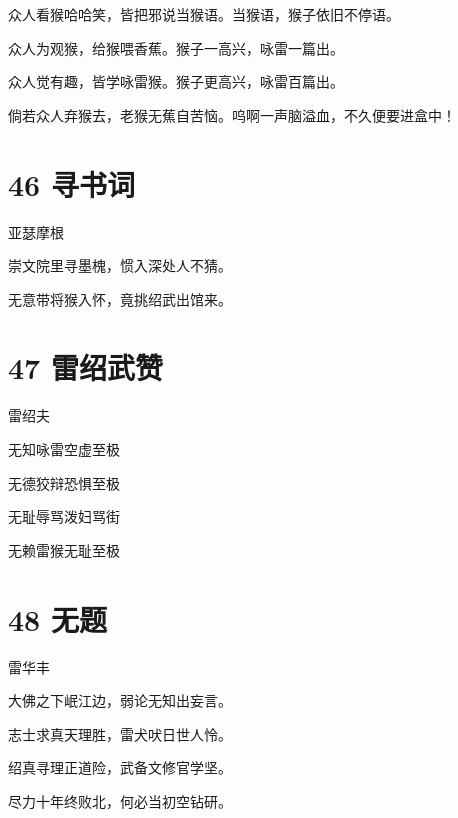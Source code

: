 \documentclass[UTF8,12pt,oneside]{ctexbook}
\begin{document}
        众人看猴哈哈笑，皆把邪说当猴语。当猴语，猴子依旧不停语。
        
        众人为观猴，给猴喂香蕉。猴子一高兴，咏雷一篇出。
        
        众人觉有趣，皆学咏雷猴。猴子更高兴，咏雷百篇出。
        
        倘若众人弃猴去，老猴无蕉自苦恼。呜啊一声脑溢血，不久便要进盒中！
        
        \newpage
        
        \section{46 寻书词}
        \begin{center}
            亚瑟摩根
        \end{center}
        
        \begin{center}
            崇文院里寻墨槐，惯入深处人不猜。
        
            无意带将猴入怀，竟挑绍武出馆来。
        \end{center}
        
        \section{47 雷绍武赞}
        \begin{center}
            雷绍夫
        \end{center}
        
        \begin{center}
            无知咏雷空虚至极
            
            无德狡辩恐惧至极
            
            无耻辱骂泼妇骂街
            
            无赖雷猴无耻至极
        \end{center}
        
        \section{48 无题}
        \begin{center}
            雷华丰
        \end{center}
        
        \begin{center}
            大佛之下岷江边，弱论无知出妄言。
       
            志士求真天理胜，雷犬吠日世人怜。
            
            绍真寻理正道险，武备文修官学坚。
        
            尽力十年终败北，何必当初空钻研。
        \end{center}
        
\end{document}
